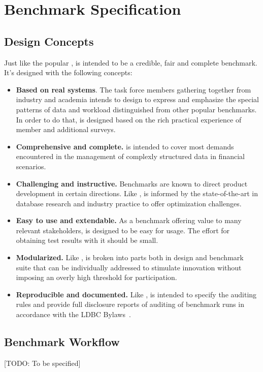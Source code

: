 \chapter{Benchmark Specification}
\label{sec:benchmark-specification}

\section{Design Concepts}

Just like the popular \ldbcsnb, \ldbcfinbench is intended to be a credible, fair and complete benchmark.
It's designed with the following concepts:

\begin{itemize}
      \item \textbf{Based on real systems}. The task force members gathering together from industry and academia intends to design \ldbcfinbench to express and emphasize the special patterns of data and workload distinguished from other popular benchmarks. In order to do that, \ldbcfinbench is designed based on the rich practical experience of member and additional surveys.
      \item \textbf{Comprehensive and complete.} \ldbcfinbench is intended to cover most demands encountered in the management of complexly structured data in financial scenarios.
      \item \textbf{Challenging and instructive.} Benchmarks are known to direct product development in certain directions. Like \ldbcsnb, \ldbcfinbench is informed by the state-of-the-art in database research and industry practice to offer optimization challenges.
      \item \textbf{Easy to use and extendable.} As a benchmark offering value to many relevant stakeholders, \ldbcfinbench is designed to be easy for usage. The effort for obtaining test results with it should be small.
      \item \textbf{Modularized.} Like \ldbcsnb, \ldbcfinbench is broken into parts both in design and benchmark suite that can be individually addressed to stimulate innovation without imposing an overly high threshold for participation.
      \item \textbf{Reproducible and documented.} Like \ldbcsnb, \ldbcfinbench is intended to specify the auditing rules and provide full disclosure reports of auditing of benchmark runs in accordance with the LDBC Bylaws~\cite{ldbc_byelaws}.
\end{itemize}


\section{Benchmark Workflow}
 [TODO: To be specified]

